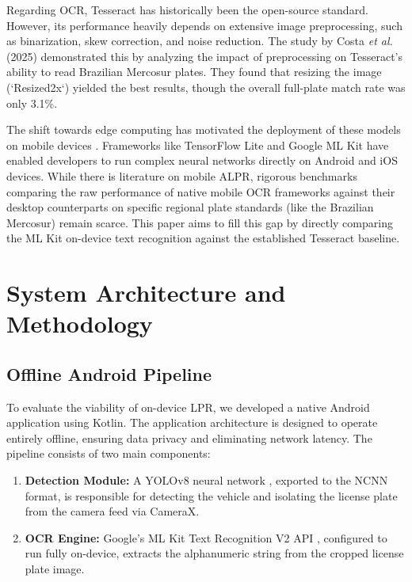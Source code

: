\documentclass[conference]{IEEEtran}
\begin{document}
Regarding OCR, Tesseract has historically been the open-source standard. However, its performance heavily depends on extensive image preprocessing, such as binarization, skew correction, and noise reduction. The study by Costa \textit{et al.} (2025) \cite{cbic2025} demonstrated this by analyzing the impact of preprocessing on Tesseract's ability to read Brazilian Mercosur plates. They found that resizing the image (`Resized2x`) yielded the best results, though the overall full-plate match rate was only 3.1\%.

The shift towards edge computing has motivated the deployment of these models on mobile devices \cite{satyanarayanan2017edge}. Frameworks like TensorFlow Lite and Google ML Kit have enabled developers to run complex neural networks directly on Android and iOS devices. While there is literature on mobile ALPR, rigorous benchmarks comparing the raw performance of native mobile OCR frameworks against their desktop counterparts on specific regional plate standards (like the Brazilian Mercosur) remain scarce. This paper aims to fill this gap by directly comparing the ML Kit on-device text recognition against the established Tesseract baseline.

\section{System Architecture and Methodology}
\label{sec:methodology}

\subsection{Offline Android Pipeline}
To evaluate the viability of on-device LPR, we developed a native Android application using Kotlin. The application architecture is designed to operate entirely offline, ensuring data privacy and eliminating network latency. The pipeline consists of two main components:
\begin{enumerate}
    \item \textbf{Detection Module:} A YOLOv8 neural network \cite{jocher2023yolov8}, exported to the NCNN format, is responsible for detecting the vehicle and isolating the license plate from the camera feed via CameraX.
    \item \textbf{OCR Engine:} Google's ML Kit Text Recognition V2 API \cite{google2023mlkit}, configured to run fully on-device, extracts the alphanumeric string from the cropped license plate image.
\end{enumerate}
\end{document}
